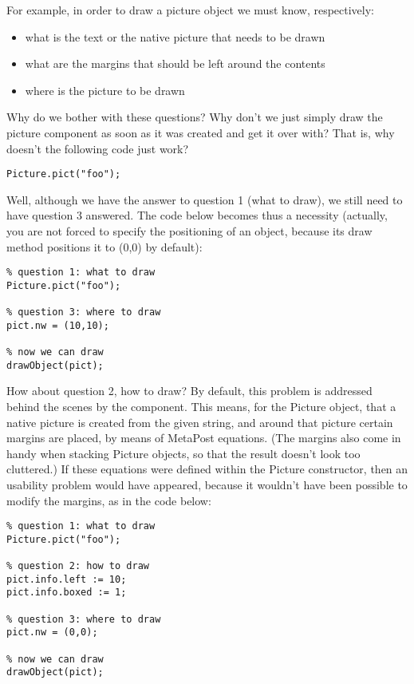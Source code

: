 \documentclass{article}
\newcommand{\code}{\ttfamily}
\begin{document}
For example, in order to draw a picture object we must know, respectively:
\begin{itemize}
\item what is the text or the native picture that needs to be drawn
\item what are the margins that should be left around the contents
\item where is the picture to be drawn
\end{itemize}

Why do we bother with these questions? Why don't we just simply draw the picture
component as soon as it was created and get it over with?
That is, why doesn't the following code just work?

\begin{verbatim}
Picture.pict("foo");
\end{verbatim}

Well, although we have the answer to question 1 (what to draw),
we still need to have question 3 answered. The code below becomes thus a
necessity (actually, you are not forced to specify the positioning of an object,
because its draw method positions it to {\code (0,0)} by default):

\begin{verbatim}
% question 1: what to draw
Picture.pict("foo");

% question 3: where to draw
pict.nw = (10,10);

% now we can draw
drawObject(pict);
\end{verbatim}

How about question 2, how to draw? By default, this problem is addressed behind the
scenes by the component. This means, for the Picture object, that a native picture is created
from the given string, and around that picture certain margins are placed, by means of MetaPost equations.
(The margins also come in handy when stacking Picture objects, so that the result doesn't look too cluttered.)
If these equations were defined within the Picture constructor, then an
usability problem would have appeared, because it wouldn't have been possible to modify the margins,
as in the code below:

\begin{verbatim}
% question 1: what to draw
Picture.pict("foo");

% question 2: how to draw
pict.info.left := 10;
pict.info.boxed := 1;

% question 3: where to draw
pict.nw = (0,0);

% now we can draw
drawObject(pict);
\end{verbatim}
\end{document}
